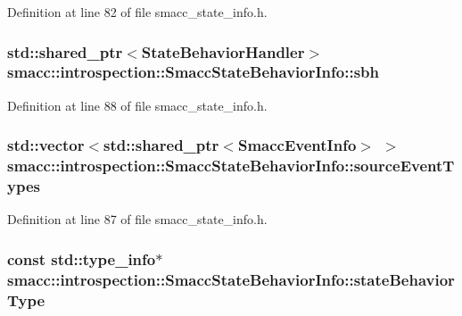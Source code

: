 Definition at line 82 of file smacc\+\_\+state\+\_\+info.\+h.

\subsubsection[{\texorpdfstring{sbh}{sbh}}]{\setlength{\rightskip}{0pt plus 5cm}std\+::shared\+\_\+ptr$<${\bf State\+Behavior\+Handler}$>$ smacc\+::introspection\+::\+Smacc\+State\+Behavior\+Info\+::sbh}\hypertarget{structsmacc_1_1introspection_1_1SmaccStateBehaviorInfo_a023a46dffcf0dc85c90281783a1c8dff}{}\label{structsmacc_1_1introspection_1_1SmaccStateBehaviorInfo_a023a46dffcf0dc85c90281783a1c8dff}


Definition at line 88 of file smacc\+\_\+state\+\_\+info.\+h.

\subsubsection[{\texorpdfstring{source\+Event\+Types}{sourceEventTypes}}]{\setlength{\rightskip}{0pt plus 5cm}std\+::vector$<$std\+::shared\+\_\+ptr$<${\bf Smacc\+Event\+Info}$>$ $>$ smacc\+::introspection\+::\+Smacc\+State\+Behavior\+Info\+::source\+Event\+Types}\hypertarget{structsmacc_1_1introspection_1_1SmaccStateBehaviorInfo_af4ad563a4b9ed8951ddd33732d466cf4}{}\label{structsmacc_1_1introspection_1_1SmaccStateBehaviorInfo_af4ad563a4b9ed8951ddd33732d466cf4}


Definition at line 87 of file smacc\+\_\+state\+\_\+info.\+h.

\subsubsection[{\texorpdfstring{state\+Behavior\+Type}{stateBehaviorType}}]{\setlength{\rightskip}{0pt plus 5cm}const std\+::type\+\_\+info$\ast$ smacc\+::introspection\+::\+Smacc\+State\+Behavior\+Info\+::state\+Behavior\+Type}\hypertarget{structsmacc_1_1introspection_1_1SmaccStateBehaviorInfo_a85dc84a01fbd0b830ed6598996c4a7c9}{}\label{structsmacc_1_1introspection_1_1SmaccStateBehaviorInfo_a85dc84a01fbd0b830ed6598996c4a7c9}



